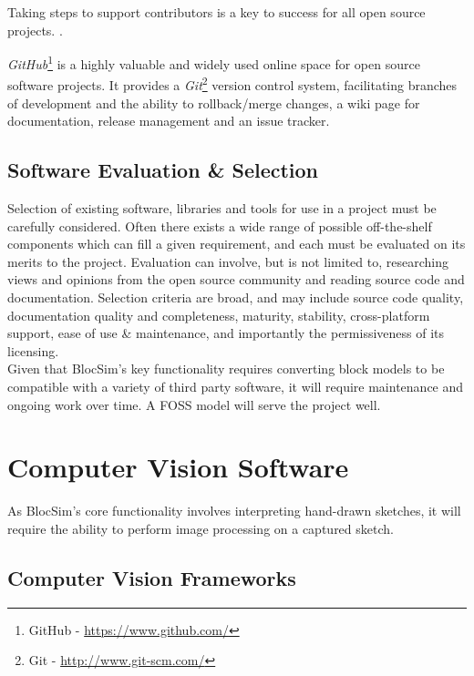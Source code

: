 Taking steps to support contributors is a key to success for all open source projects. \cite{openSource2}. 

\textit{GitHub}\footnote{GitHub - \url{https://www.github.com/}} is a highly valuable and widely used online space for open source software projects. It provides a \textit{Git}\footnote{Git - \url{http://www.git-scm.com/}} version control system, facilitating branches of development and the ability to rollback/merge changes, a wiki page for documentation, release management and an issue tracker.

\vspace{0.5 cm}

\subsection{Software Evaluation \& Selection}

Selection of existing software, libraries and tools for use in a project must be carefully considered. Often there exists a wide range of possible off-the-shelf components which can fill a given requirement, and each must be evaluated on its merits to the project. Evaluation can involve, but is not limited to, researching views and opinions from the open source community and reading source code and documentation. Selection criteria are broad, and may include source code quality, documentation quality and completeness, maturity, stability, cross-platform support, ease of use \& maintenance, and importantly the permissiveness of its licensing. \cite{openSource}
\\

Given that BlocSim's key functionality requires converting block models to be compatible with a variety of third party software, it will require maintenance and ongoing work over time. A FOSS model will serve the project well.



\section{Computer Vision Software}
\label{sec:cv}

As BlocSim's core functionality involves interpreting hand-drawn sketches, it will require the ability to perform image processing on a captured sketch.

\subsection{Computer Vision Frameworks}

